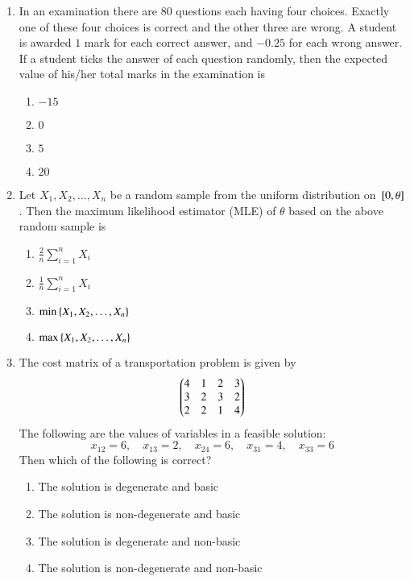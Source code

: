 \documentclass[journal,12pt,onecolumn]{IEEEtran}
\theoremstyle{remark}
\begin{document}
\begin{enumerate}
\item In an examination there are $80$ questions each having four choices. Exactly one of these four choices is correct and the other three are wrong. A student is awarded $1$ mark for each correct answer, and $-0.25$ for each wrong answer. If a student ticks the answer of each question randomly, then the expected value of his/her total marks in the examination is  
\\[-0.3em]\makebox[\textwidth][r]{\textit{[GATE EE 2025]}}

\begin{enumerate}[label=(\Alph*)]
\item $-15$
\item $0$
\item $5$
\item $20$
\end{enumerate}

\item Let $X_1, X_2, \dots, X_n$ be a random sample from the uniform distribution on ${}\left[0, \theta\right]$. Then the maximum likelihood estimator (MLE) of $\theta$ based on the above random sample is  
\\[-0.3em]\makebox[\textwidth][r]{\textit{[GATE EE 2025]}}

\begin{enumerate}[label=(\Alph*)]
\item $\frac{2}{n} \sum_{i=1}^n X_i$
\item $\frac{1}{n} \sum_{i=1}^n X_i$
\item $\min \left\{X_1, X_2, \dots, X_n\right\}$
\item $\max \left\{X_1, X_2, \dots, X_n\right\}$
\end{enumerate}

\item The cost matrix of a transportation problem is given by  
\[
\begin{pmatrix}
4 & 1 & 2 & 3 \\
3 & 2 & 3 & 2 \\
2 & 2 & 1 & 4
\end{pmatrix}
\]
The following are the values of variables in a feasible solution:  
\[
x_{12} = 6,\quad x_{13} = 2,\quad x_{24} = 6,\quad x_{31} = 4,\quad x_{33} = 6
\]
Then which of the following is correct?  
\\[-0.3em]\makebox[\textwidth][r]{\textit{[GATE EE 2025]}}

\begin{enumerate}[label=(\Alph*)]
\item The solution is degenerate and basic
\item The solution is non-degenerate and basic
\item The solution is degenerate and non-basic
\item The solution is non-degenerate and non-basic
\end{enumerate}


\end{enumerate}
\end{document}
